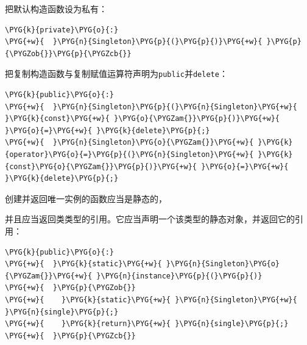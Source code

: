 
把默认构造函数设为私有：



\begin{codeblockbg}
\begin{Verbatim}[commandchars=\\\{\},breaklines=true,breakanywhere=true,fontsize=\codefont,xleftmargin=17bp]
\PYG{k}{private}\PYG{o}{:}
\PYG{+w}{  }\PYG{n}{Singleton}\PYG{p}{(}\PYG{p}{)}\PYG{+w}{ }\PYG{p}{\PYGZob{}}\PYG{p}{\PYGZcb{}}
\end{Verbatim}
\end{codeblockbg}



把复制构造函数与复制赋值运算符声明为\texttt{public}并\texttt{delete}：



\begin{codeblockbg}
\begin{Verbatim}[commandchars=\\\{\},breaklines=true,breakanywhere=true,fontsize=\codefont,xleftmargin=17bp]
\PYG{k}{public}\PYG{o}{:}
\PYG{+w}{  }\PYG{n}{Singleton}\PYG{p}{(}\PYG{n}{Singleton}\PYG{+w}{ }\PYG{k}{const}\PYG{+w}{ }\PYG{o}{\PYGZam{}}\PYG{p}{)}\PYG{+w}{ }\PYG{o}{=}\PYG{+w}{ }\PYG{k}{delete}\PYG{p}{;}
\PYG{+w}{  }\PYG{n}{Singleton}\PYG{o}{\PYGZam{}}\PYG{+w}{ }\PYG{k}{operator}\PYG{o}{=}\PYG{p}{(}\PYG{n}{Singleton}\PYG{+w}{ }\PYG{k}{const}\PYG{o}{\PYGZam{}}\PYG{p}{)}\PYG{+w}{ }\PYG{o}{=}\PYG{+w}{ }\PYG{k}{delete}\PYG{p}{;}
\end{Verbatim}
\end{codeblockbg}



创建并返回唯一实例的函数应当是静态的，



并且应当返回类类型的引用。它应当声明一个该类型的静态对象，并返回它的引用：



\begin{codeblockbg}
\begin{Verbatim}[commandchars=\\\{\},breaklines=true,breakanywhere=true,fontsize=\codefont,xleftmargin=17bp]
\PYG{k}{public}\PYG{o}{:}
\PYG{+w}{  }\PYG{k}{static}\PYG{+w}{ }\PYG{n}{Singleton}\PYG{o}{\PYGZam{}}\PYG{+w}{ }\PYG{n}{instance}\PYG{p}{(}\PYG{p}{)}
\PYG{+w}{  }\PYG{p}{\PYGZob{}}
\PYG{+w}{    }\PYG{k}{static}\PYG{+w}{ }\PYG{n}{Singleton}\PYG{+w}{ }\PYG{n}{single}\PYG{p}{;}
\PYG{+w}{    }\PYG{k}{return}\PYG{+w}{ }\PYG{n}{single}\PYG{p}{;}
\PYG{+w}{  }\PYG{p}{\PYGZcb{}}
\end{Verbatim}
\end{codeblockbg}


